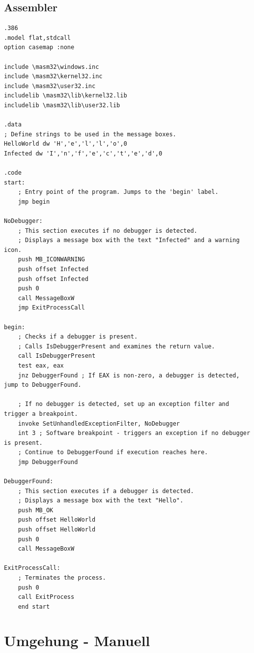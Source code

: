 \documentclass{article}
\begin{document}
	\pagebreak
	
	\subsection*{Assembler}
	\begin{lstlisting}[language={[x86masm]Assembler}]
.386
.model flat,stdcall
option casemap :none

include \masm32\windows.inc
include \masm32\kernel32.inc
include \masm32\user32.inc
includelib \masm32\lib\kernel32.lib
includelib \masm32\lib\user32.lib

.data
; Define strings to be used in the message boxes.
HelloWorld dw 'H','e','l','l','o',0
Infected dw 'I','n','f','e','c','t','e','d',0

.code
start:
	; Entry point of the program. Jumps to the 'begin' label.
	jmp begin

NoDebugger:
	; This section executes if no debugger is detected.
	; Displays a message box with the text "Infected" and a warning icon.
	push MB_ICONWARNING
	push offset Infected
	push offset Infected
	push 0
	call MessageBoxW
	jmp ExitProcessCall

begin:
	; Checks if a debugger is present.
	; Calls IsDebuggerPresent and examines the return value.
	call IsDebuggerPresent
	test eax, eax
	jnz DebuggerFound ; If EAX is non-zero, a debugger is detected, jump to DebuggerFound.
	
	; If no debugger is detected, set up an exception filter and trigger a breakpoint.
	invoke SetUnhandledExceptionFilter, NoDebugger
	int 3 ; Software breakpoint - triggers an exception if no debugger is present.
	; Continue to DebuggerFound if execution reaches here.
	jmp DebuggerFound

DebuggerFound:
	; This section executes if a debugger is detected.
	; Displays a message box with the text "Hello".
	push MB_OK
	push offset HelloWorld
	push offset HelloWorld
	push 0
	call MessageBoxW

ExitProcessCall:
	; Terminates the process.
	push 0
	call ExitProcess
	end start
	\end{lstlisting}
	
	\section*{Umgehung - Manuell}
\end{document}
